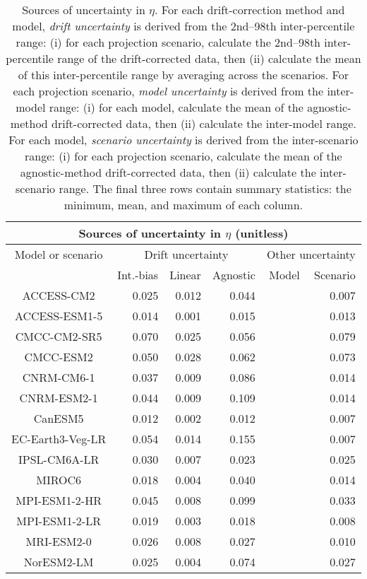 \begin{table*}[t]
\centering
\caption{Sources of uncertainty in $\eta$. For each drift-correction method and model, \emph{drift uncertainty} is derived from the 2nd--98th inter-percentile range: (i) for each projection scenario, calculate the 2nd--98th inter-percentile range of the drift-corrected data, then (ii) calculate the mean of this inter-percentile range by averaging across the scenarios. For each projection scenario, \emph{model uncertainty} is derived from the inter-model range: (i) for each model, calculate the mean of the agnostic-method drift-corrected data, then (ii) calculate the inter-model range. For each model, \emph{scenario uncertainty} is derived from the inter-scenario range: (i) for each projection scenario, calculate the mean of the agnostic-method drift-corrected data, then (ii) calculate the inter-scenario range. The final three rows contain summary statistics: the minimum, mean, and maximum of each column.}
\begin{tabular}{c|rrr|rr}
\toprule
\multicolumn{6}{c}{Sources of uncertainty in $\eta$ (unitless)} \\ 
\midrule
Model or scenario & \multicolumn{3}{c|}{Drift uncertainty} & \multicolumn{2}{c}{Other uncertainty} \\
 & Int.-bias & Linear & Agnostic & Model & Scenario \\
\midrule
ACCESS-CM2 & 0.025 & 0.012 & 0.044 &  & 0.007 \\
ACCESS-ESM1-5 & 0.014 & 0.001 & 0.015 &  & 0.013 \\
CMCC-CM2-SR5 & 0.070 & 0.025 & 0.056 &  & 0.079 \\
CMCC-ESM2 & 0.050 & 0.028 & 0.062 &  & 0.073 \\
CNRM-CM6-1 & 0.037 & 0.009 & 0.086 &  & 0.014 \\
CNRM-ESM2-1 & 0.044 & 0.009 & 0.109 &  & 0.014 \\
CanESM5 & 0.012 & 0.002 & 0.012 &  & 0.007 \\
EC-Earth3-Veg-LR & 0.054 & 0.014 & 0.155 &  & 0.007 \\
IPSL-CM6A-LR & 0.030 & 0.007 & 0.023 &  & 0.025 \\
MIROC6 & 0.018 & 0.004 & 0.040 &  & 0.014 \\
MPI-ESM1-2-HR & 0.045 & 0.008 & 0.099 &  & 0.033 \\
MPI-ESM1-2-LR & 0.019 & 0.003 & 0.018 &  & 0.008 \\
MRI-ESM2-0 & 0.026 & 0.008 & 0.027 &  & 0.010 \\
NorESM2-LM & 0.025 & 0.004 & 0.074 &  & 0.027 \\

\end{tabular}
\end{table*}
